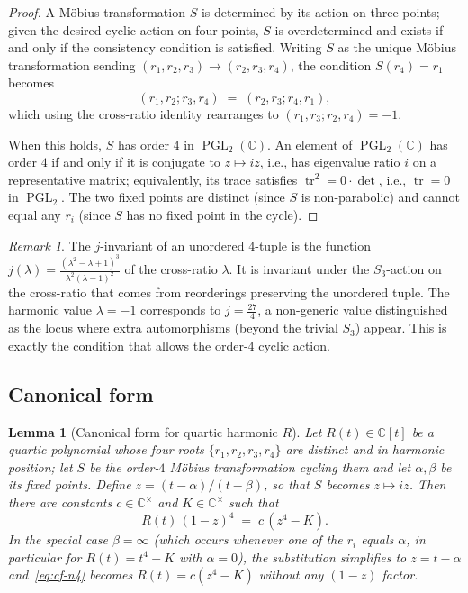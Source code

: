 \documentclass[11pt,a4paper]{article}
\theoremstyle{plain}
\newtheorem{lemma}[theorem]{Lemma}
\theoremstyle{definition}
\theoremstyle{remark}
\newtheorem{remark}[theorem]{Remark}
\newcommand{\C}{\mathbb{C}}
\newcommand{\PGL}{\operatorname{PGL}}
\begin{document}
\begin{proof}
A Möbius transformation $S$ is determined by its action on three points; given the desired cyclic action on four points, $S$ is overdetermined and exists if and only if the consistency condition is satisfied. Writing $S$ as the unique Möbius transformation sending $(r_1, r_2, r_3) \to (r_2, r_3, r_4)$, the condition $S(r_4) = r_1$ becomes
\[
  (r_1, r_2; r_3, r_4) \;=\; (r_2, r_3; r_4, r_1),
\]
which using the cross-ratio identity rearranges to $(r_1, r_3; r_2, r_4) = -1$.

When this holds, $S$ has order $4$ in $\PGL_2(\C)$. An element of $\PGL_2(\C)$ has order $4$ if and only if it is conjugate to $z \mapsto iz$, i.e., has eigenvalue ratio $i$ on a representative matrix; equivalently, its trace satisfies $\operatorname{tr}^2 = 0 \cdot \det$, i.e., $\operatorname{tr} = 0$ in $\PGL_2$. The two fixed points are distinct (since $S$ is non-parabolic) and cannot equal any $r_i$ (since $S$ has no fixed point in the cycle).
\end{proof}

\begin{remark}
The $j$-invariant of an unordered $4$-tuple is the function $j(\lambda) = \frac{(\lambda^2 - \lambda + 1)^3}{\lambda^2(\lambda - 1)^2}$ of the cross-ratio $\lambda$. It is invariant under the $S_3$-action on the cross-ratio that comes from reorderings preserving the unordered tuple. The harmonic value $\lambda = -1$ corresponds to $j = \frac{27}{4}$, a non-generic value distinguished as the locus where extra automorphisms (beyond the trivial $S_3$) appear. This is exactly the condition that allows the order-$4$ cyclic action.
\end{remark}

\subsection*{Canonical form}

\begin{lemma}[Canonical form for quartic harmonic $R$]\label{lem:cf-n4}
Let $R(t) \in \C[t]$ be a quartic polynomial whose four roots $\{r_1, r_2, r_3, r_4\}$ are distinct and in harmonic position; let $S$ be the order-$4$ Möbius transformation cycling them and let $\alpha, \beta$ be its fixed points. Define $z = (t - \alpha)/(t - \beta)$, so that $S$ becomes $z \mapsto iz$. Then there are constants $c \in \C^\times$ and $K \in \C^\times$ such that
\begin{equation}\label{eq:cf-n4}
  R(t)\,(1-z)^4 \;=\; c\,(z^4 - K).
\end{equation}
In the special case $\beta = \infty$ (which occurs whenever one of the $r_i$ equals $\alpha$, in particular for $R(t) = t^4 - K$ with $\alpha = 0$), the substitution simplifies to $z = t - \alpha$ and~\eqref{eq:cf-n4} becomes $R(t) = c(z^4 - K)$ without any $(1-z)$ factor.
\end{lemma}
\end{document}
